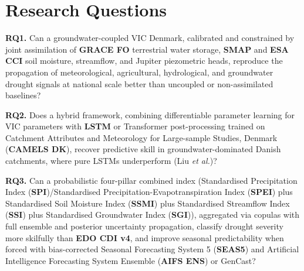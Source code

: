 \section{Research Questions}

\textbf{RQ1.} Can a groundwater-coupled VIC Denmark, calibrated and constrained by joint assimilation of \textbf{GRACE FO} terrestrial water storage, \textbf{SMAP} and \textbf{ESA CCI} soil moisture, streamflow, and Jupiter piezometric heads, reproduce the propagation of meteorological, agricultural, hydrological, and groundwater drought signals at national scale better than uncoupled or non-assimilated baselines?

\textbf{RQ2.} Does a hybrid framework, combining differentiable parameter learning for VIC parameters with \textbf{LSTM} or Transformer post-processing trained on Catchment Attributes and Meteorology for Large-sample Studies, Denmark (\textbf{CAMELS DK}), recover predictive skill in groundwater-dominated Danish catchments, where pure LSTMs underperform (Liu \textit{et al.})?

\textbf{RQ3.} Can a probabilistic four-pillar combined index (Standardised Precipitation Index (\textbf{SPI})/Standardised Precipitation-Evapotranspiration Index (\textbf{SPEI}) plus Standardised Soil Moisture Index (\textbf{SSMI}) plus Standardised Streamflow Index (\textbf{SSI}) plus Standardised Groundwater Index (\textbf{SGI})), aggregated via copulas with full ensemble and posterior uncertainty propagation, classify drought severity more skilfully than \textbf{EDO CDI v4}, and improve seasonal predictability when forced with bias-corrected Seasonal Forecasting System 5 (\textbf{SEAS5}) and Artificial Intelligence Forecasting System Ensemble (\textbf{AIFS ENS}) or GenCast?
